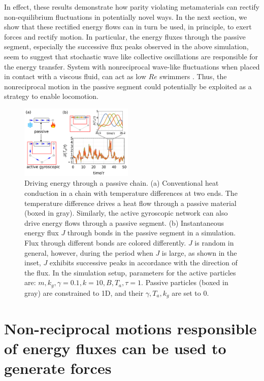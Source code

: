 \documentclass[
 preprint,
 preprintnumbers,
 amsmath,amssymb,
 aps,
 pre,
 longbibliography,
 superscriptaddress,
 10pt, twocolumn
]{revtex4-1}
\begin{document}
In effect, these results demonstrate how parity violating metamaterials can rectify non-equilibrium fluctuations in potentially novel ways. In the next section, we show that these rectified energy flows can in turn be used, in principle, to exert forces and rectify motion. In particular, the energy fluxes through the passive segment, especially the successive flux peaks observed in the above simulation, seem to suggest that stochastic wave like collective oscillations are responsible for the energy transfer. System with nonreciprocal wave-like fluctuations when placed in contact with a viscous fluid, can act as low $Re$ swimmers \cite{Taylor1951AnalysisSwimming,Purcell1977LifeLow,Golestanian2008AnalyticResults}. Thus, the nonreciprocal motion in the passive segment could potentially be exploited as a strategy to enable locomotion. 



\begin{figure}[tbp]
	\centering
	\includegraphics[width=0.48\textwidth]{simulation_j.pdf}
    \caption{
    Driving energy through a passive chain.
    (a) Conventional heat conduction in a chain with temperature differences at two ends. The temperature difference drives a heat flow through a passive material (boxed in gray).
    Similarly, the active gyroscopic network can also drive energy flows through a passive segment.
    (b) Instantaneous energy flux $J$ through bonds in the passive segment in a simulation. Flux through different bonds are colored differently. $J$ is random in general, however, during the period when $J$ is large, as shown in the inset, $J$ exhibits successive peaks in accordance with the direction of the flux.
    In the simulation setup, parameters for the active particles are: $m,k_g,\gamma=0.1, k=10, B,T_a,\tau=1$. Passive particles (boxed in gray) are constrained to 1D, and their $\gamma,T_a,k_g$ are set to $0$.
    }
    \label{fig:simulation}
\end{figure}
\section{Non-reciprocal motions responsible of energy fluxes can be used to generate forces} \label{sec:swimmer}
\end{document}

